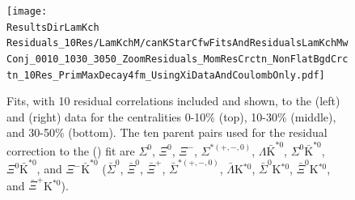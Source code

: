 \documentclass[../AnalysisNoteJBuxton.tex]{subfiles}
\begin{document}
\begin{figure}[h]
  \centering
  \texttt{[image: \\ResultsDirLamKch Residuals\_10Res/LamKchM/canKStarCfwFitsAndResidualsLamKchMwConj\_0010\_1030\_3050\_ZoomResiduals\_MomResCrctn\_NonFlatBgdCrctn\_10Res\_PrimMaxDecay4fm\_UsingXiDataAndCoulombOnly.pdf]}
  \caption[\LamKchMALamKchP Fits showing 10 Residuals]{Fits, with 10 residual correlations included and shown, to the \LamKchM (left) and \ALamKchP (right) data for the centralities 0-10\% (top), 10-30\% (middle), and 30-50\% (bottom).  The ten parent pairs used for the residual correction to the \LamKchM (\ALamKchP) fit are $\Sigma^{0}$\KchM, $\Xi^{0}$\KchM, $\Xi^{-}$\KchM, $\Sigma^{*(+,-,0)}$\KchM, $\Lambda\bar{\mathrm{K}}^{*0}$, $\Sigma^{0}\bar{\mathrm{K}}^{*0}$, $\Xi^{0}\bar{\mathrm{K}}^{*0}$, and $\Xi^{-}\bar{\mathrm{K}}^{*0}$ ($\bar{\Sigma}^{0}$\KchP, $\bar{\Xi}^{0}$\KchP, $\bar{\Xi}^{+}$\KchP, $\bar{\Sigma}^{*(+,-,0)}$\KchP, $\bar{\Lambda}$K$^{*0}$, $\bar{\Sigma}^{0}$K$^{*0}$, $\bar{\Xi}^{0}$K$^{*0}$, and $\bar{\Xi}^{+}$K$^{*0}$).}
  \label{fig:LamKchMwConjFitsAndResiduals_10Res}
\end{figure}
\end{document}
